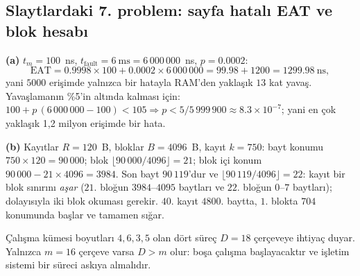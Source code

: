 \documentclass[11pt,a4paper]{article}
\begin{document}
\subsection{Slaytlardaki 7. problem: sayfa hatalı EAT ve blok hesabı}
\textbf{(a)} $t_m = 100$~ns, $t_{\text{fault}} = 6\ \text{ms} = 6\,000\,000$~ns, $p = 0.0002$:
\[
\text{EAT} = 0.9998 \times 100 + 0.0002 \times 6\,000\,000 = 99.98 + 1200 = 1299.98\ \text{ns},
\]
yani $5000$ erişimde yalnızca bir hatayla RAM'den yaklaşık $13$ kat yavaş. Yavaşlamanın \%5'in altında kalması için: $100 + p\,(6\,000\,000 - 100) < 105 \Rightarrow p < 5/5\,999\,900 \approx 8.3\times10^{-7}$; yani en çok yaklaşık 1,2 milyon erişimde bir hata.

\textbf{(b)} Kayıtlar $R = 120$~B, bloklar $B = 4096$~B, kayıt $k = 750$: bayt konumu $750 \times 120 = 90\,000$; blok $\lfloor 90\,000/4096\rfloor = 21$; blok içi konum $90\,000 - 21 \times 4096 = 3984$. Son bayt $90\,119$'dur ve $\lfloor 90\,119/4096\rfloor = 22$: kayıt bir blok sınırını \emph{aşar} ($21$. bloğun $3984$--$4095$ baytları ve $22$. bloğun $0$--$7$ baytları); dolayısıyla iki blok okuması gerekir. $40$. kayıt $4800$. baytta, $1$. blokta $704$ konumunda başlar ve tamamen sığar.

\begin{example}
Çalışma kümesi boyutları $4, 6, 3, 5$ olan dört süreç $D = 18$ çerçeveye ihtiyaç duyar. Yalnızca $m = 16$ çerçeve varsa $D > m$ olur: boşa çalışma başlayacaktır ve işletim sistemi bir süreci askıya almalıdır.
\end{example}

\end{document}
